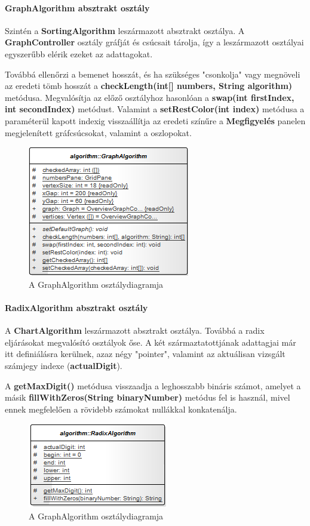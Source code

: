 \documentclass{elteikthesis}
\begin{document}
\paragraph{GraphAlgorithm absztrakt osztály}
Szintén a \textbf{SortingAlgorithm} leszármazott absztrakt osztálya. A \textbf{GraphController} osztály gráfját és csúcsait tárolja, így a leszármazott osztályai egyszerűbb elérik ezeket az adattagokat.\par
Továbbá ellenőrzi a bemenet hosszát, és ha szükséges "csonkolja" vagy megnöveli az eredeti tömb hosszát a \textbf{checkLength(int[] numbers, String algorithm)} metódusa. Megvalósítja az előző osztályhoz hasonlóan a \textbf{swap(int firstIndex, int secondIndex)} metódust. Valamint a \textbf{setRestColor(int index)} metódusa a paraméterül kapott indexig visszaállítja az eredeti színűre a \textbf{Megfigyelés} panelen megjelenített gráfcsúcsokat, valamint a oszlopokat.
\begin{figure}[H]
	\centering
	\includegraphics{pics/class/GraphAlgorithm.png}
	\caption{A GraphAlgorithm osztálydiagramja}
\end{figure}
\paragraph{RadixAlgorithm absztrakt osztály}
A \textbf{ChartAlgorithm} leszármazott absztrakt osztálya. Továbbá a radix eljárásokat megvalósító osztályok őse. A két származtatottjának adattagjai már itt definiálásra kerülnek, azaz négy "pointer", valamint az aktuálisan vizsgált számjegy indexe (\textbf{actualDigit}).\par
A \textbf{getMaxDigit()} metódusa visszaadja a leghosszabb bináris számot, amelyet a másik \textbf{fillWithZeros(String binaryNumber)} metódus fel is használ, mivel ennek megfelelően a rövidebb számokat nullákkal konkatenálja.
\begin{figure}[H]
	\centering
	\includegraphics{pics/class/RadixAlgorithm.png}
	\caption{A GraphAlgorithm osztálydiagramja}
\end{figure}
\end{document}

